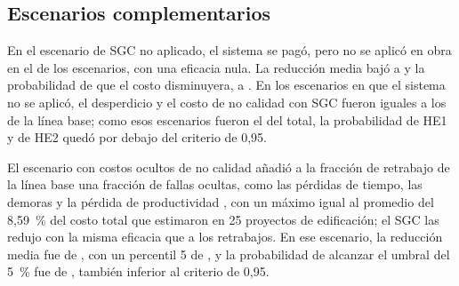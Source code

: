 \begin{table}[H]
\caption{Robustez del resultado ante variantes de los supuestos principales}
\label{tab:variantes}
\end{table}

\subsection{Escenarios complementarios}
\label{sec:res-escenarios}

En el escenario de SGC no aplicado, el sistema se pagó, pero no se aplicó en obra en el \PiFalla{} de los escenarios, con una eficacia nula. La reducción media bajó a \rMediaFalla{} y la probabilidad de que el costo disminuyera, a \PRposFalla{}. En los escenarios en que el sistema no se aplicó, el desperdicio y el costo de no calidad con SGC fueron iguales a los de la línea base; como esos escenarios fueron el \PiFalla{} del total, la probabilidad de HE1 y de HE2 quedó por debajo del criterio de 0,95.

El escenario con costos ocultos de no calidad añadió a la fracción de retrabajo de la línea base una fracción de fallas ocultas, como las pérdidas de tiempo, las demoras y la pérdida de productividad \parencite[p.~5418]{khadim2023}, con un máximo igual al promedio del 8,59~\% del costo total que \textcite[p.~5421]{khadim2023} estimaron en 25 proyectos de edificación; el SGC las redujo con la misma eficacia que a los retrabajos. En ese escenario, la reducción media fue de \rMediaOcultos{}, con un percentil 5 de \rPcincoOcultos{}, y la probabilidad de alcanzar el umbral del 5~\% fue de \PHGocultos{}, también inferior al criterio de 0,95.

